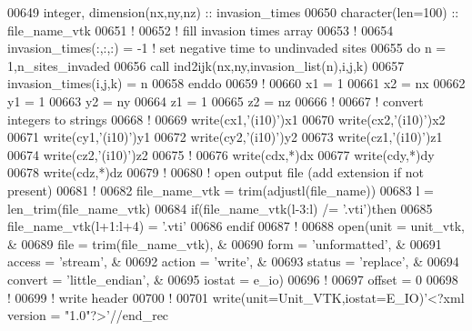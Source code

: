 \begin{DoxyCode}
00649 \textcolor{keywordtype}{integer}, \textcolor{keywordtype}{dimension(nx,ny,nz)} :: invasion\_times
00650 \textcolor{keywordtype}{character(len=100)} :: file\_name\_vtk
00651 \textcolor{comment}{!}
00652 \textcolor{comment}{! fill invasion times array}
00653 \textcolor{comment}{!}
00654 invasion\_times(:,:,:) = -1 \textcolor{comment}{! set negative time to undinvaded sites}
00655 \textcolor{keyword}{do} n = 1,n\_sites\_invaded
00656    call ind2ijk(nx,ny,invasion\_list(n),i,j,k)
00657    invasion\_times(i,j,k) = n
00658 \textcolor{keyword}{enddo}
00659 \textcolor{comment}{!}
00660 x1 = 1
00661 x2 = nx
00662 y1 = 1
00663 y2 = ny
00664 z1 = 1
00665 z2 = nz
00666 \textcolor{comment}{!}
00667 \textcolor{comment}{! convert integers to strings}
00668 \textcolor{comment}{!}
00669 \textcolor{keyword}{write}(cx1,\textcolor{stringliteral}{'(i10)'})x1
00670 \textcolor{keyword}{write}(cx2,\textcolor{stringliteral}{'(i10)'})x2
00671 \textcolor{keyword}{write}(cy1,\textcolor{stringliteral}{'(i10)'})y1
00672 \textcolor{keyword}{write}(cy2,\textcolor{stringliteral}{'(i10)'})y2
00673 \textcolor{keyword}{write}(cz1,\textcolor{stringliteral}{'(i10)'})z1
00674 \textcolor{keyword}{write}(cz2,\textcolor{stringliteral}{'(i10)'})z2
00675 \textcolor{comment}{!}
00676 \textcolor{keyword}{write}(cdx,*)dx
00677 \textcolor{keyword}{write}(cdy,*)dy
00678 \textcolor{keyword}{write}(cdz,*)dz
00679 \textcolor{comment}{!}
00680 \textcolor{comment}{! open output file (add extension if not present)}
00681 \textcolor{comment}{!}
00682 file\_name\_vtk = trim(adjustl(file\_name))
00683 l = len\_trim(file\_name\_vtk)
00684 \textcolor{keyword}{if}(file\_name\_vtk(l-3:l) /= \textcolor{stringliteral}{'.vti'})\textcolor{keyword}{then}
00685    file\_name\_vtk(l+1:l+4) = \textcolor{stringliteral}{'.vti'}
00686 \textcolor{keyword}{endif}
00687 \textcolor{comment}{!}
00688 \textcolor{keyword}{open}(unit       = unit\_vtk,            &
00689      file       = trim(file\_name\_vtk), &
00690      form       = \textcolor{stringliteral}{'unformatted'},       &
00691      access     = \textcolor{stringliteral}{'stream'},            &
00692      action     = \textcolor{stringliteral}{'write'},             &
00693      status     = \textcolor{stringliteral}{'replace'},           &
00694      convert    = \textcolor{stringliteral}{'little\_endian'},     &
00695      iostat     = e\_io)
00696 \textcolor{comment}{!}
00697 offset = 0
00698 \textcolor{comment}{!}
00699 \textcolor{comment}{! write header}
00700 \textcolor{comment}{!}
00701 \textcolor{keyword}{write}(unit=Unit\_VTK,iostat=E\_IO)\textcolor{stringliteral}{'<?xml version = "1.0"?>'}//end\_rec

\end{DoxyCode}
